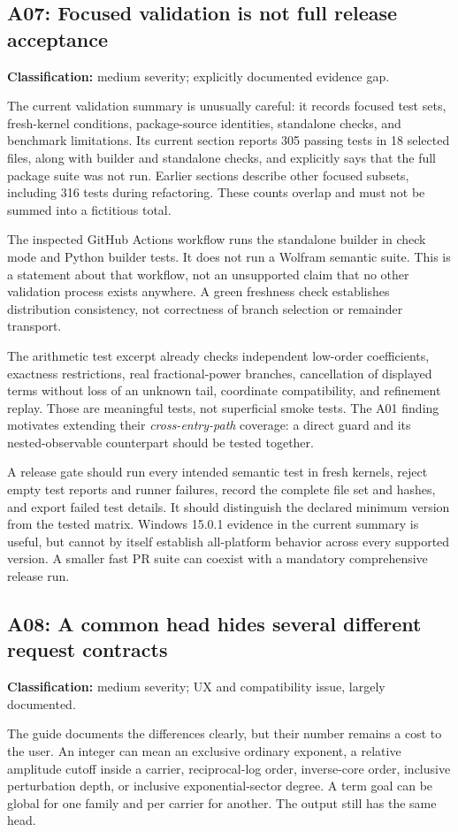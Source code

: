 \documentclass[11pt,letterpaper]{article}
\newcommand{\finding}[3]{\subsection{#1: #2}\textbf{Classification:} #3.\par}
\begin{document}
\finding{A07}{Focused validation is not full release acceptance}{medium severity; explicitly documented evidence gap}
The current validation summary is unusually careful: it records focused test sets, fresh-kernel conditions, package-source identities, standalone checks, and benchmark limitations. Its current section reports 305 passing tests in 18 selected files, along with builder and standalone checks, and explicitly says that the full package suite was not run. Earlier sections describe other focused subsets, including 316 tests during refactoring. These counts overlap and must not be summed into a fictitious total.\cite{validation}

The inspected GitHub Actions workflow runs the standalone builder in check mode and Python builder tests. It does not run a Wolfram semantic suite. This is a statement about that workflow, not an unsupported claim that no other validation process exists anywhere. A green freshness check establishes distribution consistency, not correctness of branch selection or remainder transport.\cite{workflow}

The arithmetic test excerpt already checks independent low-order coefficients, exactness restrictions, real fractional-power branches, cancellation of displayed terms without loss of an unknown tail, coordinate compatibility, and refinement replay. Those are meaningful tests, not superficial smoke tests. The A01 finding motivates extending their \emph{cross-entry-path} coverage: a direct guard and its nested-observable counterpart should be tested together.\cite{arithmetic-tests}

A release gate should run every intended semantic test in fresh kernels, reject empty test reports and runner failures, record the complete file set and hashes, and export failed test details. It should distinguish the declared minimum version from the tested matrix. Windows 15.0.1 evidence in the current summary is useful, but cannot by itself establish all-platform behavior across every supported version. A smaller fast PR suite can coexist with a mandatory comprehensive release run.

\finding{A08}{A common head hides several different request contracts}{medium severity; UX and compatibility issue, largely documented}
The guide documents the differences clearly, but their number remains a cost to the user. An integer can mean an exclusive ordinary exponent, a relative amplitude cutoff inside a carrier, reciprocal-log order, inverse-core order, inclusive perturbation depth, or inclusive exponential-sector degree. A term goal can be global for one family and per carrier for another. The output still has the same head.\cite{guide}
\end{document}

